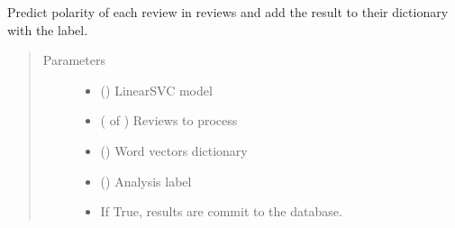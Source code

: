 \documentclass[letterpaper,10pt,english]{sphinxmanual}
\begin{document}
\begin{fulllineitems}
\label{\detokenize{learning:loacore.learning.svm.commit_analysis}}
Predict polarity of each review in reviews and add the result to their  dictionary with the
 label.
\begin{quote}\begin{description}
\item[{Parameters}] \leavevmode\begin{itemize}
\item {} 
 () \textendash{} LinearSVC model

\item {} 
 ( of {\hyperref[\detokenize{classes:loacore.classes.classes.Review}]{}}) \textendash{} Reviews to process

\item {} 
 () \textendash{} Word vectors dictionary

\item {} 
 () \textendash{} Analysis label

\item {} 
 \textendash{} If True, results are commit to the database.

\end{itemize}

\end{description}\end{quote}

\end{fulllineitems}

\end{document}
